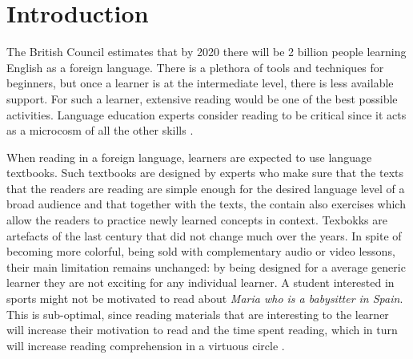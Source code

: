 
\section{Introduction}
The British Council estimates that by 2020 there will be 2 billion people learning English as a foreign language. There is a plethora of tools and techniques for beginners, but once a learner is at the intermediate level, there is less available support. For such a learner, extensive reading would be one of the best possible activities\cite{Day98-Extensive,mccarthy1999-extensive}. Language education experts consider reading to be critical since it acts as a microcosm of all the other skills \cite{mccarthy1999-microcosm}. 


When reading in a foreign language, learners are expected to use language textbooks. Such textbooks are designed by experts who make sure that the texts that the readers are reading are simple enough for the desired language level of a broad audience and that together with the texts, the contain also exercises which allow the readers to practice newly learned concepts in context. Texbokks are artefacts of the last century that did not change much over the years. In spite of becoming more colorful, being sold with complementary audio or video lessons, their main limitation remains unchanged: 
by being designed for a average generic learner they are not exciting for any individual learner. A student interested in sports might not be motivated to read about {\em Maria who is a babysitter in Spain}. This is sub-optimal, since reading materials that are interesting to the learner will increase their motivation to read and the time spent reading, which in turn will increase reading comprehension in a virtuous circle \cite{Brozo07-Engagement, Guthrie99-Motivation}.

